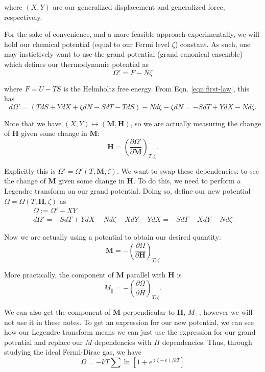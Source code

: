 \documentclass[12pt]{revtex4-2}
\begin{document}
where $(X,Y)$ are our generalized displacement and generalized force, respectively.
\par

For the sake of convenience, and a more feasible approach experimentally, we will hold our chemical potential (equal to our Fermi level $\zeta$) constant.  As such, one may instictively want to use the grand potential (grand canonical ensemble) which defines our thermodynamic potential as
\begin{equation}
    \Omega' = F - N\zeta 
\end{equation}

where $F = U-TS$ is the Helmholtz free energy.  From Eqn. \ref{eqn:first-law}, this has
\begin{equation}
    d\Omega' = (TdS + YdX + \zeta dN - SdT - TdS) - Nd\zeta - \zeta dN = -SdT + YdX - Nd\zeta.
\end{equation}

Note that we have $(X,Y) \mapsto (\mathbf{M},\mathbf{H})$, so we are actually measuring the change of $\mathbf{H}$ given some change in $\mathbf{M}$:
\begin{equation}
    \mathbf{H} = \left(\frac{\partial \Omega'}{\partial \mathbf{M}}\right)_{T,\zeta}.
\end{equation}

Explicitly this is $\Omega' = \Omega'(T,\mathbf{M},\zeta)$. We want to swap these dependencies: to see the change of $\mathbf{M}$ given some change in $\mathbf{H}$.  To do this, we need to perform a Legendre transform on our grand potential.  Doing so, define our new potential $\Omega = \Omega(T,\mathbf{H},\zeta)$ as
\begin{gather}
    \Omega := \Omega' - XY \\
     d\Omega' = -SdT + YdX - Nd\zeta - XdY - YdX = -SdT - XdY - Nd\zeta
\end{gather}

Now we are actually using a potential to obtain our desired quantity:
\begin{equation}
    \mathbf{M} = -\left( \frac{\partial\Omega}{\partial\mathbf{H}} \right)_{T,\zeta}
\end{equation}

More practically, the component of $\mathbf{M}$ parallel with $\mathbf{H}$ is
\begin{equation}
    M_\parallel = -\left( \frac{\partial \Omega}{\partial H} \right)_{T,\zeta}.
\end{equation}

We can also get the component of $\mathbf{M}$ perpendicular to $\mathbf{H}$, $M_\perp$, however we will not use it in these notes.  To get an expression for our new potential, we can see how our Legendre transform means we can just use the expression for our grand potential and replace our $M$ dependencies with $H$ dependencies.  Thus, through studying the ideal Fermi-Dirac gas, we have
\begin{equation}
    \Omega =  -kT\sum \ln\left[1 + e^{(\zeta-\epsilon)/kT}\right]
\end{equation}
\end{document}
